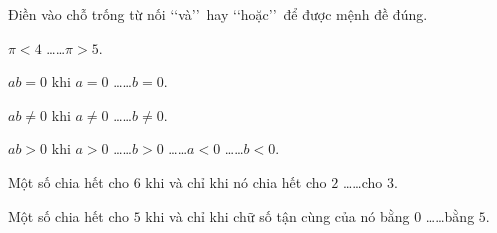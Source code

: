 \begin{bt}%
	Điền vào chỗ trống từ nối \lq\lq và\rq\rq\ hay  \lq\lq hoặc\rq\rq\ để được mệnh đề đúng.
	\begin{listEX}
		\item $\pi <4$  \dots \dots $\pi >5$.
		\item  $ab=0$ khi $a=0$ \dots \dots $b=0$.
		\item $ab\ne 0$ khi $a\ne 0$  \dots \dots $b\ne 0$.
		\item $ab>0$ khi $a>0$ \dots \dots  $b>0$ \dots \dots $a<0$ \dots \dots $b<0$.
		\item Một số chia hết cho $6$ khi và  chỉ khi nó chia hết cho $2$ \dots \dots cho $3$.
		\item Một số chia hết cho $5$ khi và chỉ khi chữ số tận cùng của nó bằng $0$ \dots \dots  bằng $5$.
	\end{listEX}
\end{bt}

